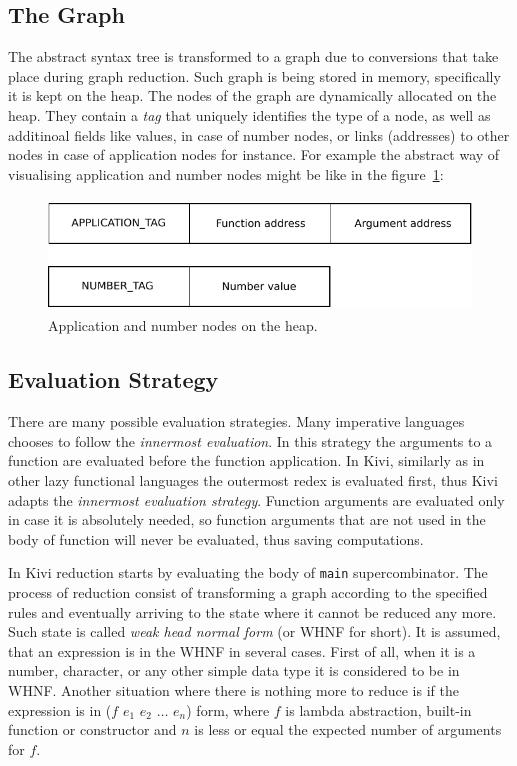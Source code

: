 \documentclass[12pt,a4paper]{report}
\begin{document}
\subsection{The Graph}
The abstract syntax tree is transformed to a graph due to conversions that take
place during graph reduction. Such graph is being stored in memory,
specifically it is kept on the heap. The nodes of the graph are dynamically
allocated on the heap. They contain a \textit{tag} that uniquely identifies the
type of a node, as well as additinoal fields like values, in case of number
nodes, or links (addresses) to other nodes in case of application nodes for
instance. For example the abstract way of visualising application and number
nodes might be like in the figure~\ref{fig:num_ap_nodes}:

\vspace*{0.2in}
\begin{figure}[h!]
  \centering
  \includegraphics[height=3cm]{nodes}
  \caption{Application and number nodes on the heap.}
  \label{fig:num_ap_nodes}
\end{figure}

\subsection{Evaluation Strategy}
There are many possible evaluation strategies. Many imperative languages
chooses to follow the \textit{innermost evaluation}. In this strategy the
arguments to a function are evaluated before the function application. In Kivi,
similarly as in other lazy functional languages the outermost redex is
evaluated first, thus Kivi adapts the \textit{innermost evaluation strategy}.
Function arguments are evaluated only in case it is absolutely needed, so
function arguments that are not used in the body of function will never be
evaluated, thus saving computations.

In Kivi reduction starts by evaluating the body of \texttt{main}
supercombinator. The process of reduction consist of transforming a graph
according to the specified rules and eventually arriving to the state where it
cannot be reduced any more. Such state is called \textit{weak head normal form}
(or WHNF for short). It is assumed, that an expression is in the WHNF in several
cases. First of all, when it is a number, character, or any other simple data
type it is considered to be in WHNF. Another situation where there is nothing
more to reduce is if the expression is in ($f$ $e_1$ $e_2$ $\ldots$ $e_n$)
form, where $f$ is lambda abstraction, built-in function or constructor and $n$
is less or equal the expected number of arguments for $f$.
\end{document}
